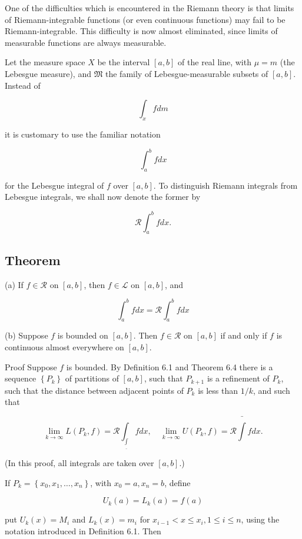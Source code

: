 \documentclass[10pt]{article}
\begin{document}
One of the difficulties which is encountered in the Riemann theory is that limits of Riemann-integrable functions (or even continuous functions) may fail to be Riemann-integrable. This difficulty is now almost eliminated, since limits of measurable functions are always measurable.

Let the measure space $X$ be the interval $[a, b]$ of the real line, with $\mu=m$ (the Lebesgue measure), and $\mathfrak{M}$ the family of Lebesgue-measurable subsets of $[a, b]$. Instead of

$$
\int_{x} f d m
$$

it is customary to use the familiar notation

$$
\int_{a}^{b} f d x
$$

for the Lebesgue integral of $f$ over $[a, b]$. To distinguish Riemann integrals from Lebesgue integrals, we shall now denote the former by

$$
\mathscr{R} \int_{a}^{b} f d x .
$$

\subsection{Theorem}
(a) If $f \in \mathscr{R}$ on $[a, b]$, then $f \in \mathscr{L}$ on $[a, b]$, and

$$
\int_{a}^{b} f d x=\mathscr{R} \int_{a}^{b} f d x
$$

(b) Suppose $f$ is bounded on $[a, b]$. Then $f \in \mathscr{R}$ on $[a, b]$ if and only if $f$ is continuous almost everywhere on $[a, b]$.

Proof Suppose $f$ is bounded. By Definition 6.1 and Theorem 6.4 there is a sequence $\left\{P_{k}\right\}$ of partitions of $[a, b]$, such that $P_{k+1}$ is a refinement of $P_{k}$, such that the distance between adjacent points of $P_{k}$ is less than $1 / k$, and such that

$$
\lim _{k \rightarrow \infty} L\left(P_{k}, f\right)=\mathscr{R} \int_{\underline{\int}} f d x, \quad \lim _{k \rightarrow \infty} U\left(P_{k}, f\right)=\mathscr{R} \bar{\int} f d x .
$$

(In this proof, all integrals are taken over $[a, b]$.)

If $P_{k}=\left\{x_{0}, x_{1}, \ldots, x_{n}\right\}$, with $x_{0}=a, x_{n}=b$, define

$$
U_{k}(a)=L_{k}(a)=f(a)
$$

put $U_{k}(x)=M_{i}$ and $L_{k}(x)=m_{i}$ for $x_{i-1}<x \leq x_{i}, 1 \leq i \leq n$, using the notation introduced in Definition 6.1. Then
\end{document}
